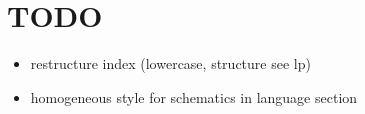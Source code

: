 \section{TODO}
\begin{itemize}
\item restructure index (lowercase, structure see lp)
\item homogeneous style for schematics in language section

\end{itemize}
